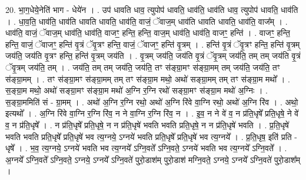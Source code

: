 \documentclass[17pt]{extarticle}
\begin{document}
20. भा॒ग॒धेये॒नेति॑ भाग - धेये॑न । . उप॑ धावति धाव॒ त्युपोप॑ धावति॒ धाव॑ति॒ धाव॑ति धाव॒ त्युपोप॑ धावति॒ धाव॑ति । . धा॒व॒ति॒ धाव॑ति॒ धाव॑ति धावति धावति॒ धाव॑ति॒ वाजं॒ ॅवाज॒म् धाव॑ति धावति धावति॒ धाव॑ति॒ वाज᳚म् । . धाव॑ति॒ वाजं॒ ॅवाज॒म् धाव॑ति॒ धाव॑ति॒ वाजꣳ॒॒ हन्ति॒ हन्ति॒ वाज॒म् धाव॑ति॒ धाव॑ति॒ वाजꣳ॒॒ हन्ति॑ । . वाजꣳ॒॒ हन्ति॒ हन्ति॒ वाजं॒ ॅवाजꣳ॒॒ हन्ति॑ वृ॒त्रं ॅवृ॒त्रꣳ हन्ति॒ वाजं॒ ॅवाजꣳ॒॒ हन्ति॑ वृ॒त्रम् । . हन्ति॑ वृ॒त्रं ॅवृ॒त्रꣳ हन्ति॒ हन्ति॑ वृ॒त्रम् जय॑ति॒ जय॑ति वृ॒त्रꣳ हन्ति॒ हन्ति॑ वृ॒त्रम् जय॑ति । . वृ॒त्रम् जय॑ति॒ जय॑ति वृ॒त्रं ॅवृ॒त्रम् जय॑ति॒ तम् तम् जय॑ति वृ॒त्रं ॅवृ॒त्रम् जय॑ति॒ तम् । . जय॑ति॒ तम् तम् जय॑ति॒ जय॑ति॒ तꣳ स॑ङ्ग्रा॒मꣳ स॑ङ्ग्रा॒मम् तम् जय॑ति॒ जय॑ति॒ तꣳ स॑ङ्ग्रा॒मम् । . तꣳ स॑ङ्ग्रा॒मꣳ स॑ङ्ग्रा॒मम् तम् तꣳ स॑ङ्ग्रा॒म मथो॒ अथो॑ सङ्ग्रा॒मम् तम् तꣳ स॑ङ्ग्रा॒म मथो᳚ । . स॒ङ्ग्रा॒म मथो॒ अथो॑ सङ्ग्रा॒मꣳ स॑ङ्ग्रा॒म मथो॑ अ॒ग्नि र॒ग्नि रथो॑ सङ्ग्रा॒मꣳ स॑ङ्ग्रा॒म मथो॑ अ॒ग्निः । . स॒ङ्ग्रा॒ममिति॑ सं - ग्रा॒मम् । . अथो॑ अ॒ग्नि र॒ग्नि रथो॒ अथो॑ अ॒ग्नि रि॑वे वा॒ग्नि रथो॒ अथो॑ अ॒ग्नि रि॑व । . अथो॒ इत्यथो᳚ । . अ॒ग्नि रि॑वे वा॒ग्नि र॒ग्नि रि॑व॒ न ने वा॒ग्नि र॒ग्नि रि॑व॒ न । . इ॒व॒ न ने वे॑ व॒ न प्र॑ति॒धृषे᳚ प्रति॒धृषे॒ ने वे॑ व॒ न प्र॑ति॒धृषे᳚ । . न प्र॑ति॒धृषे᳚ प्रति॒धृषे॒ न न प्र॑ति॒धृषे॑ भवति भवति प्रति॒धृषे॒ न न प्र॑ति॒धृषे॑ भवति । . प्र॒ति॒धृषे॑ भवति भवति प्रति॒धृषे᳚ प्रति॒धृषे॑ भव त्य॒ग्नये॒ ऽग्नये॑ भवति प्रति॒धृषे᳚ प्रति॒धृषे॑ भव त्य॒ग्नये᳚ । . प्र॒ति॒धृष॒ इति॑ प्रति - धृषे᳚ । . भ॒व॒ त्य॒ग्नये॒ ऽग्नये॑ भवति भव त्य॒ग्नये᳚ ऽग्नि॒वते᳚ ऽग्नि॒वते॒ ऽग्नये॑ भवति भव त्य॒ग्नये᳚ ऽग्नि॒वते᳚ । . अ॒ग्नये᳚ ऽग्नि॒वते᳚ ऽग्नि॒वते॒ ऽग्नये॒ ऽग्नये᳚ ऽग्नि॒वते॑ पुरो॒डाश॑म् पुरो॒डाश॑ मग्नि॒वते॒ ऽग्नये॒ ऽग्नये᳚ ऽग्नि॒वते॑ पुरो॒डाश᳚म् । \newline
\end{document}
